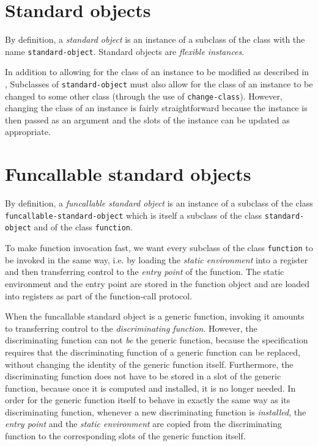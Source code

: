 \section{Standard objects}
\label{sec-data-representation-standard-objects}

By definition, a \emph{standard object} is an instance of a subclass
of the class with the name \texttt{standard-object}.  Standard objects
are \emph{flexible instances}.

In addition to allowing for the class of an instance to be modified as
described in ,
Subclasses of \texttt{standard-object} must also allow for the class
of an instance to be changed to some other class (through the use of
\texttt{change-class}).  However, changing the class of an instance is
fairly straightforward because the instance is then passed as an
argument and the slots of the instance can be updated as appropriate.

\section{Funcallable standard objects}
\label{sec-data-representation-funcallable-standard-objects}

By definition, a \emph{funcallable standard object} is an instance of
a subclass of the class \texttt{funcallable-standard-object} which is
itself a subclass of the class \texttt{standard-object}
 and of the class
\texttt{function}. 

To make function invocation fast, we want every subclass of the class
\texttt{function} to be invoked in the same way, i.e. by loading the
\emph{static environment} into a register and then transferring
control to the \emph{entry point} of the function. The static
environment and the entry point are stored in the function object
and are loaded into registers as part of the function-call protocol.

When the funcallable standard object is a generic function, invoking
it amounts to transferring control to the \emph{discriminating
  function}.  However, the discriminating function can not \emph{be}
the generic function, because the \clos{} specification requires that
the discriminating function of a generic function can be replaced,
without changing the identity of the generic function itself.
Furthermore, the discriminating function does not have to be stored in
a slot of the generic function, because once it is computed and
installed, it is no longer needed.  In order for the generic function
itself to behave in exactly the same way as its discriminating
function, whenever a new discriminating function is \emph{installed},
the \emph{entry point} and the \emph{static environment} are copied
from the discriminating function to the corresponding slots of the
generic function itself.

